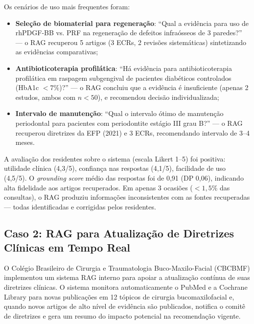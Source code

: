 Os cenários de uso mais frequentes foram:
\begin{itemize}
    \item \textbf{Seleção de biomaterial para regeneração}: ``Qual a evidência para uso de rhPDGF-BB vs. PRF na regeneração de defeitos infraósseos de 3 paredes?'' --- o RAG recuperou 5 artigos (3 ECRs, 2 revisões sistemáticas) sintetizando as evidências comparativas;

    \item \textbf{Antibioticoterapia profilática}: ``Há evidência para antibioticoterapia profilática em raspagem subgengival de pacientes diabéticos controlados (HbA1c $<7\%$)?'' --- o RAG concluiu que a evidência é insuficiente (apenas 2 estudos, ambos com $n < 50$), e recomendou decisão individualizada;

    \item \textbf{Intervalo de manutenção}: ``Qual o intervalo ótimo de manutenção periodontal para pacientes com periodontite estágio III grau B?'' --- o RAG recuperou diretrizes da EFP (2021) e 3 ECRs, recomendando intervalo de 3--4 meses.
\end{itemize}

A avaliação dos residentes sobre o sistema (escala Likert 1--5) foi positiva: utilidade clínica (4,3/5), confiança nas respostas (4,1/5), facilidade de uso (4,5/5). O \textit{grounding score} médio das respostas foi de 0,91 (DP 0,06), indicando alta fidelidade aos artigos recuperados. Em apenas 3 ocasiões ($<1,5\%$ das consultas), o RAG produziu informações inconsistentes com as fontes recuperadas --- todas identificadas e corrigidas pelos residentes.

\subsection{Caso 2: RAG para Atualização de Diretrizes Clínicas em Tempo Real}

O Colégio Brasileiro de Cirurgia e Traumatologia Buco-Maxilo-Facial (CBCBMF) implementou um sistema RAG interno para apoiar a atualização contínua de suas diretrizes clínicas. O sistema monitora automaticamente o PubMed e a Cochrane Library para novas publicações em 12 tópicos de cirurgia bucomaxilofacial e, quando novos artigos de alto nível de evidência são publicados, notifica o comitê de diretrizes e gera um resumo do impacto potencial na recomendação vigente.


